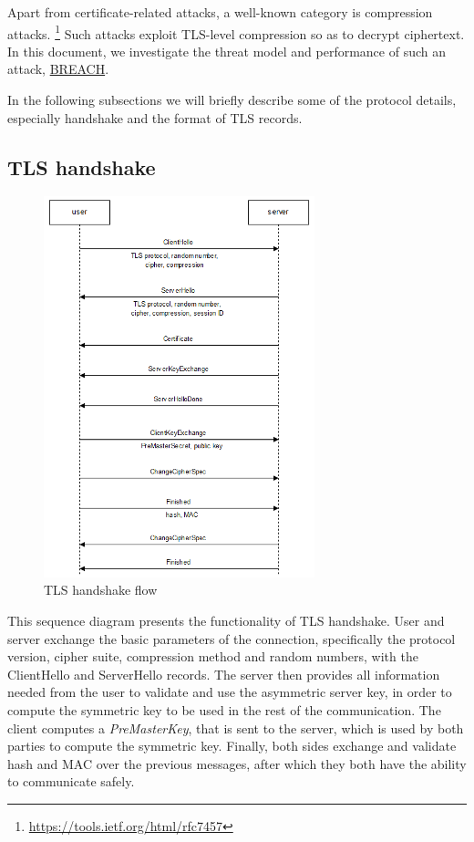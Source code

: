 Apart from certificate-related attacks, a well-known category is compression
attacks. \footnote{\url{https://tools.ietf.org/html/rfc7457}} Such attacks
exploit TLS-level compression so as to decrypt ciphertext. In this document, we
investigate the threat model and performance of such an attack,
\href{http://breachattack.com}{BREACH}.

In the following subsections we will briefly describe some of the protocol
details, especially handshake and the format of TLS records.

\subsection{TLS handshake}

\begin{figure}[H] \caption{TLS handshake flow} \centering
\includegraphics[width=0.7\textwidth]{diagrams/tls_handshake.png}\end{figure}

This sequence diagram presents the functionality of TLS handshake. User and
server exchange the basic parameters of the connection, specifically the
protocol version, cipher suite, compression method and random numbers, with the
ClientHello and ServerHello records. The server then provides all information
needed from the user to validate and use the asymmetric server key, in order to
compute the symmetric key to be used in the rest of the communication. The
client computes a \textit{PreMasterKey}, that is sent to the server, which is
used by both parties to compute the symmetric key. Finally, both sides exchange
and validate hash and MAC over the previous messages, after which they both have
the ability to communicate safely.


